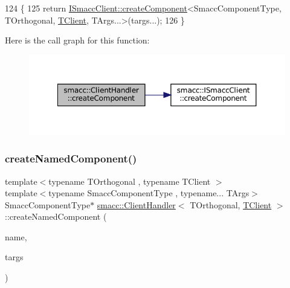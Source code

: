 \begin{DoxyCode}
124     \{
125         \textcolor{keywordflow}{return} \hyperlink{classsmacc_1_1ISmaccClient_a5c1c8eb5e91a3b399662a52cb0ca86aa}{ISmaccClient::createComponent}<SmaccComponentType, TOrthogonal, 
      \hyperlink{classTClient}{TClient}, TArgs...>(targs...);
126     \}
\end{DoxyCode}
Here is the call graph for this function\+:
\nopagebreak
\begin{figure}[H]
\begin{center}
\leavevmode
\includegraphics[width=350pt]{classsmacc_1_1ClientHandler_a4a9adad4c37104586c9b595d9030bb3c_cgraph}
\end{center}
\end{figure}
\mbox{\label{classsmacc_1_1ClientHandler_a33f440a8e06038df0dd291d2ea278f39}} 
\subsubsection{\texorpdfstring{create\+Named\+Component()}{createNamedComponent()}}
{\footnotesize\ttfamily template$<$typename T\+Orthogonal , typename T\+Client $>$ \\
template$<$typename Smacc\+Component\+Type , typename... T\+Args$>$ \\
Smacc\+Component\+Type$\ast$ \hyperlink{classsmacc_1_1ClientHandler}{smacc\+::\+Client\+Handler}$<$ T\+Orthogonal, \hyperlink{classTClient}{T\+Client} $>$\+::create\+Named\+Component (\begin{DoxyParamCaption}\item[{std\+::string}]{name,  }\item[{T\+Args...}]{targs }\end{DoxyParamCaption})\hspace{0.3cm}{\ttfamily [inline]}}



